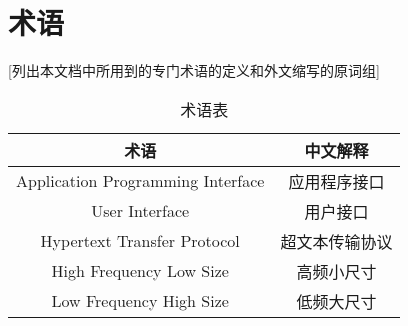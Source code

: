 \section{术语}
[列出本文档中所用到的专门术语的定义和外文缩写的原词组]
\begin{table}[htbp]
\centering
\caption{术语表} \label{tab:terminology}
\begin{tabular}{|c|c|}
    \hline
    \hline
    术语 & 中文解释 \\
    \hline
    Application Programming Interface & 应用程序接口\\
    \hline
    User Interface & 用户接口\\
    \hline
    Hypertext Transfer Protocol & 超文本传输协议\\
    \hline
    High Frequency Low Size & 高频小尺寸\\
    \hline
    Low Frequency High Size & 低频大尺寸\\
    \hline
\end{tabular}
\end{table}